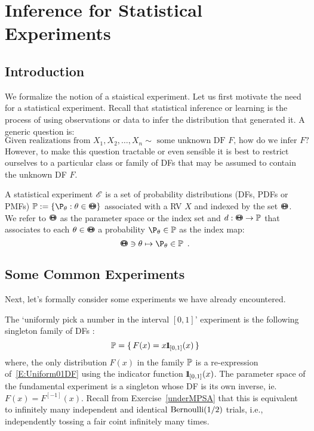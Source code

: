 \chapter{Inference for Statistical Experiments}\label{S:StatExps}
\section{Introduction}\label{S:ExpsIntro}
We formalize the notion of a staistical experiment.  Let us first motivate the need for a statistical experiment.  Recall that statistical inference or learning is the process of using observations or data to infer the distribution that generated it.  A generic question is:
\[
\text{Given realizations from $X_1, X_2, \ldots, X_n \sim$ some unknown DF $F$, how do we infer $F$} ?
\]
However, to make this question tractable or even sensible it is best to restrict ourselves to a particular  class or family of DFs that may be assumed to contain the unknown DF $F$.

\begin{definition}[Experiment]
A statistical experiment $\mathscr{E}$ is a set of probability distributions (DFs, PDFs or PMFs) 
$\Pz := \{\P_{\theta} : \theta \in \BB{\Theta} \}$ associated with a RV $X$ and indexed by the set ${\Theta}\mspace{-11 mu}{\Theta}$.  
We refer to ${\Theta}\mspace{-11 mu}{\Theta}$ as the parameter space or the index set and $d:{\Theta}\mspace{-11 mu}{\Theta} \rightarrow \mathbb{P}$ that associates to each $\theta \in {\Theta}\mspace{-11 mu}{\Theta}$ a probability $\P_{\theta} \in \Pz$ as the index map:
\[ \BB{\Theta} \ni \theta \mapsto \P_{\theta} \in \Pz \enspace .\]
\end{definition}

\section{Some Common Experiments}
Next, let's formally consider some experiments we have already encountered.
\begin{Exp}\label{Exp:Uniform01}
The `uniformly pick a number in the interval $[0,1]$' experiment is the following singleton family of DFs  :
\[
\mathbb{P} = \{ \,  F(x) = x {1}\mspace{-11 mu}{1}_{[0,1]}(x)  \, \} 
\]
where, the only distribution $F(x)$ in the family $\mathbb{P}$ is a re-expression of~\eqref{E:Uniform01DF} using the indicator function ${1}\mspace{-11 mu}{1}_{[0,1]}(x)$.  The parameter space of the fundamental experiment is a singleton whose DF is its own inverse, ie.~$F(x) = F^{[-1]}(x)$. 
Recall from Exercise~\ref{underMPSA} that this is equivalent to infinitely many independent and identical $\mbox{{\rm Bernoulli}}(1/2)$ trials, i.e., independently tossing a fair coint infinitely many times.
\end{Exp}

